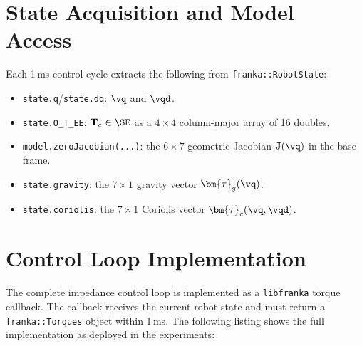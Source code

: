 \section{State Acquisition and Model Access}
\label{sec:state_model}

Each 1\,ms control cycle extracts the following from
\texttt{franka::RobotState}:

\begin{itemize}
  \item \texttt{state.q}/\texttt{state.dq}: $\vq$ and $\vqd$.
  \item \texttt{state.O\_T\_EE}: $\mathbf{T}_e\in \SE$
        as a $4\times4$ column-major array of 16 doubles.
  \item \texttt{model.zeroJacobian(...)}: the $6\times7$ geometric
        Jacobian $\mathbf{J}(\vq)$ in the base frame.
  \item \texttt{state.gravity}: the $7\times1$ gravity vector
        $\bm{\tau}_g(\vq)$.
  \item \texttt{state.coriolis}: the $7\times1$ Coriolis vector
        $\bm{\tau}_c(\vq,\vqd)$.
\end{itemize}

\section{Control Loop Implementation}
\label{sec:control_impl}

The complete impedance control loop is implemented as a \texttt{libfranka}
torque callback.
The callback receives the current robot state and must return a
\texttt{franka::Torques} object within 1\,ms.
The following listing shows the full implementation as deployed in the
experiments:

